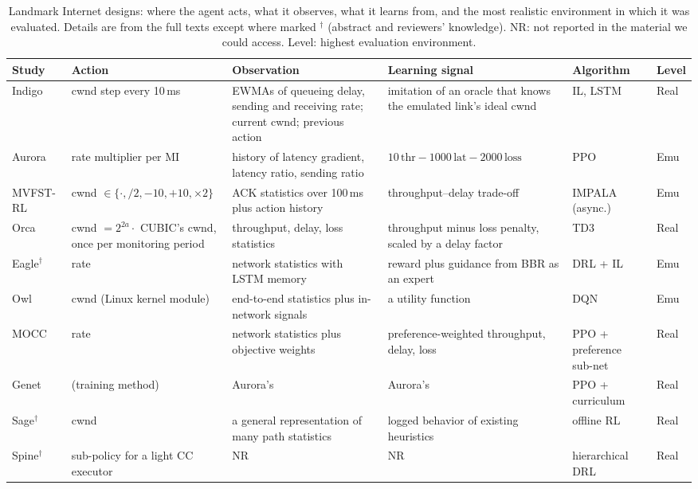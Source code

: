 \begin{table}[t]
\centering
\caption{Landmark Internet designs: where the agent acts, what it observes, what it learns from, and the most realistic environment in which it was evaluated. Details are from the full texts except where marked $^\dagger$ (abstract and reviewers' knowledge). NR: not reported in the material we could access. Level: highest evaluation environment.}
\label{tab:landmarks}
\scriptsize
\setlength{\tabcolsep}{3pt}
\begin{tabularx}{\linewidth}{@{}L{2.0cm}L{2.75cm}YL{2.55cm}L{1.75cm}l@{}}
\toprule
Study & Action & Observation & Learning signal & Algorithm & Level \\
\midrule
Indigo~\cite{yan2018pantheon} & cwnd step every 10\,ms & EWMAs of queueing delay, sending and receiving rate; current cwnd; previous action & imitation of an oracle that knows the emulated link's ideal cwnd & IL, LSTM & Real \\
Aurora~\cite{jay2019aurora} & rate multiplier per MI & history of latency gradient, latency ratio, sending ratio & $10\,\text{thr} - 1000\,\text{lat} - 2000\,\text{loss}$ & PPO & Emu \\
MVFST-RL~\cite{sivakumar2019mvfst} & cwnd $\in\{\cdot, /2, -10, +10, \times 2\}$ & ACK statistics over 100\,ms plus action history & throughput--delay trade-off & IMPALA (async.) & Emu \\
Orca~\cite{abbasloo2020orca} & cwnd $= 2^{2a}\cdot$ CUBIC's cwnd, once per monitoring period & throughput, delay, loss statistics & throughput minus loss penalty, scaled by a delay factor & TD3 & Real \\
Eagle$^\dagger$~\cite{emara2020eagle} & rate & network statistics with LSTM memory & reward plus guidance from BBR as an expert & DRL + IL & Emu \\
Owl~\cite{sacco2021owl} & cwnd (Linux kernel module) & end-to-end statistics plus in-network signals & a utility function & DQN & Emu \\
MOCC~\cite{ma2022mocc} & rate & network statistics plus objective weights & preference-weighted throughput, delay, loss & PPO + preference sub-net & Real \\
Genet~\cite{xia2022genet} & (training method) & Aurora's & Aurora's & PPO + curriculum & Real \\
Sage$^\dagger$~\cite{yen2023sage} & cwnd & a general representation of many path statistics & logged behavior of existing heuristics & offline RL & Real \\
Spine$^\dagger$~\cite{tian2024spine} & sub-policy for a light CC executor & NR & NR & hierarchical DRL & Real \\

\end{tabularx}
\end{table}
